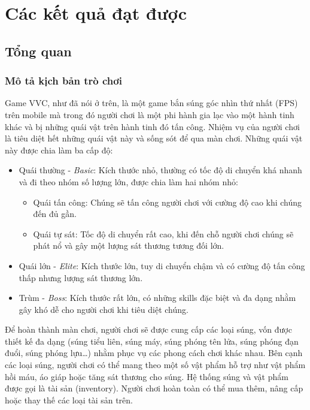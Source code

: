 \documentclass[12pt]{report}
\newcommand{\project}{VVC}
\begin{document}
\stopcontents[parts]

\part{Các kết quả đạt được}
\startcontents[parts]
\chapter{Tổng quan}
\section{Mô tả kịch bản trò chơi}
Game \project, như đã nói ở trên, là một game bắn súng góc nhìn thứ nhất (FPS) trên mobile mà trong đó người chơi là một phi hành gia lạc vào một hành tinh khác và bị những quái vật trên hành tinh đó tấn công. Nhiệm vụ của người chơi là tiêu diệt hết những quái vật này và sống sót để qua màn chơi. Những quái vật này được chia làm ba cấp độ:
\begin{itemize}
	\item Quái thường - \textit{Basic}: Kích thước nhỏ, thường có tốc độ di chuyển khá nhanh và đi theo nhóm số lượng lớn, được chia làm hai nhóm nhỏ:
	\begin{itemize}
		\item Quái tấn công: Chúng sẽ tấn công người chơi với cường độ cao khi chúng đến đủ gần.
		\item Quái tự sát: Tốc độ di chuyển rất cao, khi đến chỗ người chơi chúng sẽ phát nổ và gây một lượng sát thương tương đối lớn.
	\end{itemize}
	\item Quái lớn - \textit{Elite}: Kích thước lớn, tuy di chuyển chậm và có cường độ tấn công thấp nhưng lượng sát thương lớn.
	\item Trùm - \textit{Boss}: Kích thước rất lớn, có những skills đặc biệt và đa dạng nhằm gây khó dễ cho người chơi khi tiêu diệt chúng.
\end{itemize}

Để hoàn thành màn chơi, người chơi sẽ được cung cấp các loại súng, vốn được thiết kế đa dạng (súng tiểu liên, súng máy, súng phóng tên lửa, súng phóng đạn đuổi, súng phóng lựu\ldots) nhằm phục vụ các phong cách chơi khác nhau. Bên cạnh các loại súng, người chơi có thể mang theo một số vật phẩm hỗ trợ như vật phẩm hồi máu, áo giáp hoặc tăng sát thương cho súng. Hệ thống súng và vật phẩm được gọi là tài sản (inventory). Người chơi hoàn toàn có thể mua thêm, nâng cấp hoặc thay thế các loại tài sản trên.
\end{document}
